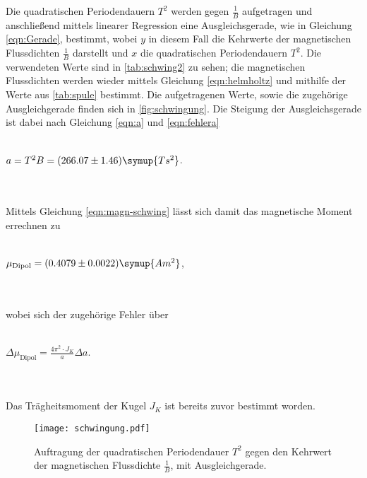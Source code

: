     Die quadratischen Periodendauern $T^2$ werden gegen $\frac{1}{B}$ aufgetragen und anschließend mittels linearer Regression eine
    Ausgleichsgerade, wie in Gleichung \eqref{eqn:Gerade}, bestimmt, wobei $y$ in diesem Fall die Kehrwerte der 
    magnetischen Flussdichten $\frac{1}{B}$ darstellt und $x$ die quadratischen Periodendauern $T^2$.
    Die verwendeten Werte sind in \autoref{tab:schwing2} zu sehen; die magnetischen Flussdichten werden wieder mittels Gleichung
    \eqref{eqn:helmholtz} und mithilfe der Werte aus \autoref{tab:spule} bestimmt.
    Die aufgetragenen Werte, sowie die zugehörige Ausgleichgerade finden sich in \autoref{fig:schwingung}.
    Die Steigung der Ausgleichsgerade ist dabei nach Gleichung \eqref{eqn:a} und \eqref{eqn:fehlera}
    \\ \\
    \centerline{$a = T^2 B = (266.07 \pm 1.46) \symup{T s^2} $.}
    \\ \\
    Mittels Gleichung \eqref{eqn:magn-schwing} lässt sich damit das magnetische Moment errechnen zu
    \\ \\
    \centerline{$\mu_\text{Dipol} = (0.4079 \pm 0.0022) \symup{A m^2}$,}
    \\ \\
    wobei sich der zugehörige Fehler über 
    \\ \\
    \centerline{$\Delta \mu_\text{Dipol} = \frac{4 \pi^2 \cdot J_K}{a} \Delta a   $.}
    \\ \\
    Das Trägheitsmoment der Kugel $J_K$ ist bereits zuvor bestimmt worden.
    
    \begin{figure}
        \centering
        \texttt{[image: schwingung.pdf]}
        \caption{Auftragung der quadratischen Periodendauer $T^2$ gegen den Kehrwert der magnetischen Flussdichte $\frac{1}{B}$, mit Ausgleichgerade.}
        \label{fig:schwingung}
    \end{figure}

